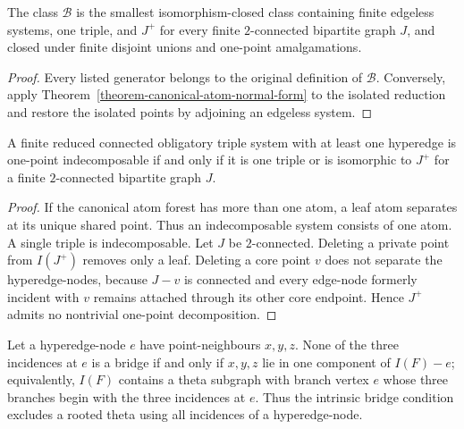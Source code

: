 \begin{corollary}
\label{corollary-minimal-obligatory-generators}
The class $\mathcal B$ is the smallest isomorphism-closed class containing
finite edgeless systems, one triple, and $J^+$ for every finite $2$-connected
bipartite graph $J$, and closed under finite disjoint unions and one-point
amalgamations.
\end{corollary}

\begin{proof}
Every listed generator belongs to the original definition of $\mathcal B$.
Conversely, apply Theorem~\ref{theorem-canonical-atom-normal-form} to the
isolated reduction and restore the isolated points by adjoining an edgeless
system.
\end{proof}

\begin{corollary}
\label{corollary-indecomposable-obligatory-systems}
A finite reduced connected obligatory triple system with at least one
hyperedge is one-point indecomposable if and only if it is one triple or is
isomorphic to $J^+$ for a finite $2$-connected bipartite graph $J$.
\end{corollary}

\begin{proof}
If the canonical atom forest has more than one atom, a leaf atom separates at
its unique shared point. Thus an indecomposable system consists of one atom.
A single triple is indecomposable. Let $J$ be $2$-connected. Deleting a
private point from $I(J^+)$ removes only a leaf. Deleting a core point $v$
does not separate the hyperedge-nodes, because $J-v$ is connected and every
edge-node formerly incident with $v$ remains attached through its other core
endpoint. Hence $J^+$ admits no nontrivial one-point decomposition.
\end{proof}

\begin{remark}
Let a hyperedge-node $e$ have point-neighbours $x,y,z$. None of the three
incidences at $e$ is a bridge if and only if $x,y,z$ lie in one component of
$I(F)-e$; equivalently, $I(F)$ contains a theta subgraph with branch vertex
$e$ whose three branches begin with the three incidences at $e$. Thus the
intrinsic bridge condition excludes a rooted theta using all incidences of a
hyperedge-node.
\end{remark}

